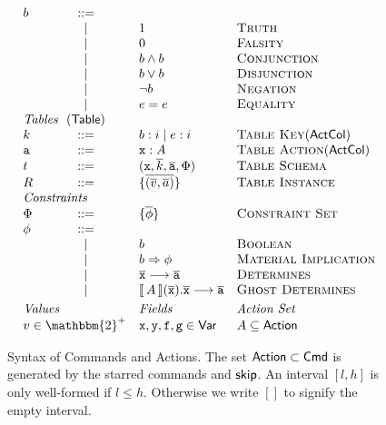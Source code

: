 \begin{figure}[ht]
\[\begin{array}{l c l l}
      b & ::= & \\
        & \mid & \TRUE & \textsc{Truth} \\
        & \mid & \FALSE & \textsc{Falsity} \\
        & \mid & b \wedge b & \textsc{Conjunction} \\
        & \mid & b \vee b & \textsc{Disjunction} \\
        & \mid & \neg b & \textsc{Negation} \\ 
        & \mid & e = e & \textsc{Equality} \\
      \multicolumn 4 l {\textit{Tables}~~(\Table)}\\
      k & ::= & b : i \mid e : i & \textsc{Table Key} (\KeyCol) \\
      \var a & ::= & \var x : A & \textsc{Table Action} (\ActCol) \\
      t & ::= & (\var x,\vec{k}, \vec{\var a}, \Phi) & \textsc{Table Schema}\\
      R & ::= & \{\overline{(\vec v, \vec a)}\} & \textsc{Table Instance} \\      
      \multicolumn 4 l {\textit{Constraints}}\\
      \Phi & ::= &\{\overline{\phi} \} & \textsc{Constraint Set}\\
      \phi & ::= & \\
        & \mid & b & \textsc{Boolean} \\
        & \mid & b \Rightarrow \phi & \textsc{Material Implication} \\
        & \mid & \vec {\var x} \longrightarrow \vec{\var a} & \textsc{Determines}\\
        & \mid & \bracbb{A}(\vec{\var x}).\vec{\var x} \longrightarrow \vec{\var a}  & \textsc{Ghost Determines} \\[.3em]
      \multicolumn{2}{l}{\textit{Values}} & \textit{Fields} & \textit{Action Set}\\
      \multicolumn{2}{l}{v \in \mathbbm{2}^+} & \var x, \var y, \var f, \var g \in \mathsf{Var} & A \subseteq \Action
    \end{array}\]
  \caption{Syntax of Commands and Actions. The set
    $\mathsf{Action} \subset \mathsf{Cmd}$ is generated by the starred commands and
    $\mathsf{skip}$. An interval $[l, h]$ is only well-formed if $l \leq
    h$. Otherwise we write $[]$ to signify the empty interval.}
  \label{fig:syntax}
\end{figure}

